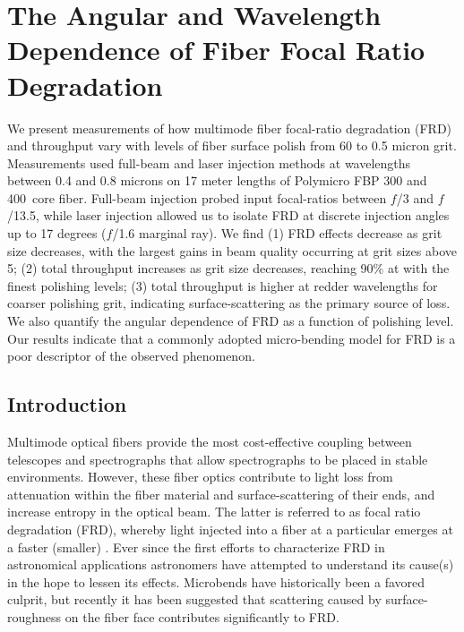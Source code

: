 \chapter[Fiber Focal Ration Degradation]{The Angular and Wavelength Dependence of Fiber Focal Ratio Degradation}
\label{chap:FRD}


\begin{chabstract}
  We present measurements of how multimode fiber focal-ratio degradation
  (FRD) and throughput vary with levels of fiber surface polish from 60
  to 0.5 micron grit. Measurements used full-beam and laser injection
  methods at wavelengths between 0.4 and 0.8 microns on 17 meter lengths
  of Polymicro FBP 300 and 400\mum\ core fiber. Full-beam injection
  probed input focal-ratios between $f$/3 and $f$/13.5, while laser
  injection allowed us to isolate FRD at discrete injection angles up to
  17 degrees ($f$/1.6 marginal ray). We find (1) FRD effects decrease as
  grit size decreases, with the largest gains in beam quality occurring
  at grit sizes above 5\mum; (2) total throughput increases as grit
  size decreases, reaching 90\% at \filtI with the finest polishing
  levels; (3) total throughput is higher at redder wavelengths for
  coarser polishing grit, indicating surface-scattering as the primary
  source of loss. We also quantify the angular dependence of FRD as a
  function of polishing level. Our results indicate that a commonly
  adopted micro-bending model for FRD is a poor descriptor of the
  observed phenomenon.
\end{chabstract}
\cleardoublepage

\section{Introduction}

Multimode optical fibers provide the most cost-effective coupling between
telescopes and spectrographs that allow spectrographs to be placed in
stable environments. However, these fiber optics contribute to light
loss from attenuation within the fiber material and surface-scattering
of their ends, and increase entropy in the optical beam. The latter is
referred to as focal ratio degradation (FRD), whereby light injected
into a fiber at a particular \fratio emerges at a faster (smaller)
\fratio. Ever since the first efforts to characterize FRD in
astronomical applications\cite{Angel77} astronomers have attempted
to understand its cause(s) in the hope to lessen its
effects\cite{Carrasco,Oliveira}. Microbends have historically been a
favored culprit\cite{Carrasco,Gloge72}, but recently it has been
suggested\cite{Haynes11, Avila98} that scattering caused by
surface-roughness on the fiber face contributes significantly to
FRD.

